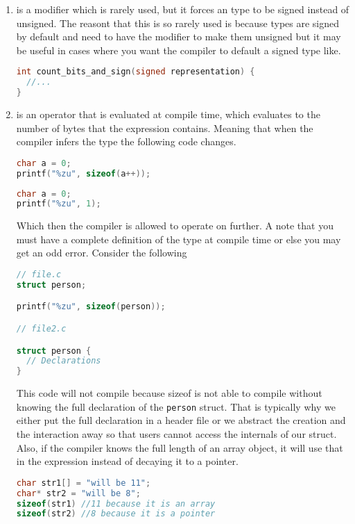 \begin{enumerate}
	\item {} is a modifier which is rarely used, but it forces an type to be signed instead of unsigned. The reasont that this is so rarely used is because types are signed by default and need to have the  modifier to make them unsigned but it may be useful in cases where you want the compiler to default a signed type like.

	      \begin{lstlisting}[language=C]
int count_bits_and_sign(signed representation) {
  //...
}
\end{lstlisting}
	\item {} is an operator that is evaluated at compile time, which evaluates to the number of bytes that the expression contains. Meaning that when the compiler infers the type the following code changes.
	      \begin{lstlisting}[language=C]
char a = 0;
printf("%zu", sizeof(a++));
\end{lstlisting}

	      \begin{lstlisting}[language=C]
char a = 0;
printf("%zu", 1);
\end{lstlisting}

	      Which then the compiler is allowed to operate on further. A note that you must have a complete definition of the type at compile time or else you may get an odd error. Consider the following

	      \begin{lstlisting}[language=C]
// file.c
struct person;

printf("%zu", sizeof(person));

// file2.c

struct person {
  // Declarations
}
\end{lstlisting}

	      This code will not compile because sizeof is not able to compile  without knowing the full declaration of the \texttt{person} struct. That is typically why we either put the full declaration in a header file or we abstract the creation and the interaction away so that users cannot access the internals of our struct. Also, if the compiler knows the full length of an array object, it will use that in the expression instead of decaying it to a pointer.

	      \begin{lstlisting}[language=C]
char str1[] = "will be 11";
char* str2 = "will be 8";
sizeof(str1) //11 because it is an array
sizeof(str2) //8 because it is a pointer
\end{lstlisting}


\end{enumerate}
